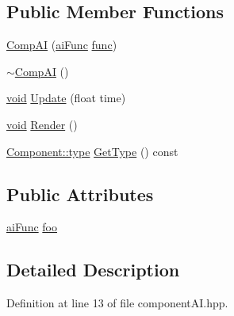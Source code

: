 \subsection*{Public Member Functions}
\begin{DoxyCompactItemize}
\item 
\hyperlink{class_comp_a_i_aa536df2cdcb07d0b5cda9bd28cb5881c}{Comp\-A\-I} (\hyperlink{component_a_i_8hpp_a19457b91cecac85b8e78aa227c222bf7}{ai\-Func} \hyperlink{_s_d_l__opengl__glext_8h_a18ae3ab36a07e388833b568cfdfa90c8}{func})
\item 
\hyperlink{class_comp_a_i_af5fa69e268f8014a06f1d833b7674c9a}{$\sim$\-Comp\-A\-I} ()
\item 
\hyperlink{_s_d_l__opengles2__gl2ext_8h_ae5d8fa23ad07c48bb609509eae494c95}{void} \hyperlink{class_comp_a_i_a24c424b8be6b67a470d89a0fa781c866}{Update} (float time)
\item 
\hyperlink{_s_d_l__opengles2__gl2ext_8h_ae5d8fa23ad07c48bb609509eae494c95}{void} \hyperlink{class_comp_a_i_afd0228f41ea5612976f08ffbcdef632a}{Render} ()
\item 
\hyperlink{class_component_ad6d161b6acf7b843b55bb9feac7af71a}{Component\-::type} \hyperlink{class_comp_a_i_ab94fe24642c71cc2c61fe13b89b4b84c}{Get\-Type} () const 
\end{DoxyCompactItemize}
\subsection*{Public Attributes}
\begin{DoxyCompactItemize}
\item 
\hyperlink{component_a_i_8hpp_a19457b91cecac85b8e78aa227c222bf7}{ai\-Func} \hyperlink{class_comp_a_i_a7b639e7a28a8b449e35c82032bfb7637}{foo}
\end{DoxyCompactItemize}


\subsection{Detailed Description}


Definition at line 13 of file component\-A\-I.\-hpp.



